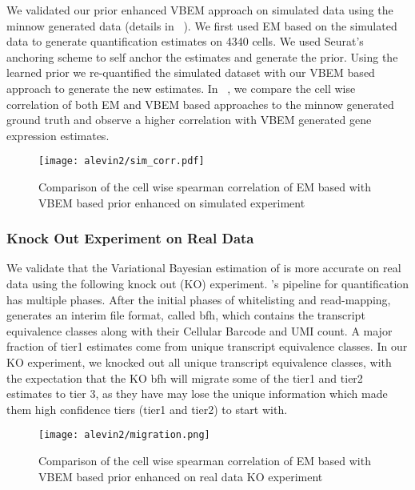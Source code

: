 We validated our prior enhanced VBEM approach on simulated data using the minnow generated data (details in
~). We first used EM based \alevin on the simulated data to generate quantification
estimates on 4340 cells. We used Seurat's anchoring scheme to self anchor the estimates and generate the
prior. Using the learned prior we re-quantified the simulated dataset with our VBEM based approach to generate 
the new estimates. In ~, we compare the cell wise correlation of both EM and  VBEM 
based approaches to the minnow generated ground truth and observe a higher correlation with VBEM generated
gene expression estimates.

  \begin{figure}[!htb]
      \centering
    \texttt{[image: alevin2/sim\_corr.pdf]}
    \caption{ Comparison of the cell wise spearman correlation of EM based \alevin with VBEM based
    prior enhanced \alevin on simulated experiment}
    \label{fig:alv2_sim_val}
  \end{figure}

\subsubsection{Knock Out Experiment on Real Data}
\label{subsec:alv2_real}
We validate that the Variational Bayesian estimation of \alevin is more accurate on real data using the
following knock out (KO) experiment. \Alevin 's pipeline for \dscrnaseq quantification has multiple 
phases. After the initial phases of whitelisting and read-mapping, \alevin generates an interim 
file format, called bfh, which contains the transcript equivalence classes along with their Cellular
Barcode and UMI count. A major fraction of tier1 estimates come from unique transcript equivalence
classes. In our KO experiment, we knocked out all unique transcript equivalence classes, with
the expectation that the KO bfh will migrate some of the tier1 and tier2 estimates to tier 3, as they have
may lose the unique information which made them high confidence tiers (tier1 and tier2) to start with. 

  \begin{figure}[!htb]
      \centering
    \texttt{[image: alevin2/migration.png]}
    \caption{ Comparison of the cell wise spearman correlation of EM based \alevin with  VBEM  based
    prior enhanced \alevin on real data KO experiment}
    \label{fig:alv2_real_val}
  \end{figure}

